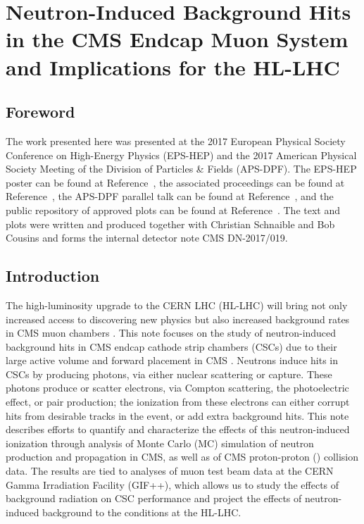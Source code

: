 \chapter{Neutron-Induced Background Hits in the CMS Endcap Muon System and Implications for the HL-LHC}
\section{Foreword}
The work presented here was presented at the 2017 European Physical Society Conference on High-Energy Physics (EPS-HEP) and the 2017 American Physical Society Meeting of the Division of Particles \& Fields (APS-DPF). The EPS-HEP poster can be found at Reference~\cite{Dasgupta:Poster}, the associated proceedings can be found at Reference~\cite{Dasgupta:Proceedings}, the APS-DPF parallel talk can be found at Reference~\cite{Schnaible:Talk}, and the public repository of approved plots can be found at Reference~\cite{NeutronTwiki}. The text and plots were written and produced together with Christian Schnaible and Bob Cousins and forms the internal detector note CMS DN-2017/019.

\section{Introduction}
\label{sec:intro}
The high-luminosity upgrade to the CERN LHC (HL-LHC) will bring not only increased access to discovering new physics but also increased background rates in CMS muon chambers \cite{Evans:2008zzb,Apollinari:2116337}. This note focuses on the study of neutron-induced background hits in CMS endcap cathode strip chambers (CSCs) due to their large active volume and forward placement in CMS \cite{CMS:1997dma,Chatrchyan:2009hb}. Neutrons induce hits in CSCs by producing photons, via either nuclear scattering or capture. These photons produce or scatter electrons, via Compton scattering, the photoelectric effect, or pair production; the ionization from these electrons can either corrupt hits from desirable tracks in the event, or add extra background hits. This note describes efforts to quantify and characterize the effects of this neutron-induced ionization through analysis of Monte Carlo (MC) simulation of neutron production and propagation in CMS, as well as of CMS proton-proton (\pp) collision data. The results are tied to analyses of muon test beam data at the CERN Gamma Irradiation Facility (GIF++), which allows us to study the effects of background radiation on CSC performance and project the effects of neutron-induced background to the conditions at the HL-LHC.

